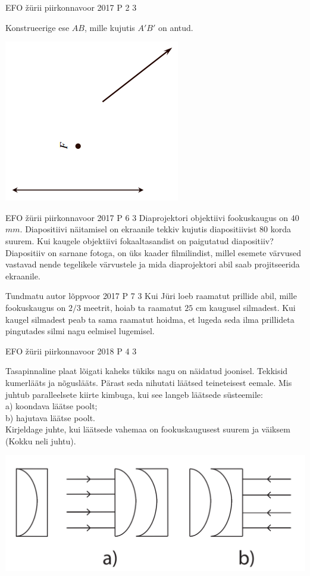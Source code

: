 \documentclass[11pt]{article}
\begin{document}
{%
{EFO žürii} %
{piirkonnavoor} %
{2017} %
{P 2} %
{3} %
{
\ifStatement
Konstrueerige ese $AB$, mille kujutis $A'B'$ on antud. 
\begin{center}
	\includegraphics[width=0.5\linewidth]{2017-v2p-02-yl.PNG}
\end{center}
\fi
}


{EFO žürii} %
{piirkonnavoor} %
{2017} %
{P 6} %
{3} %
{
\ifStatement
Diaprojektori objektiivi fookuskaugus on $40$ $mm$. Diapositiivi näitamisel on ekraanile tekkiv kujutis diapositiivist $80$ korda suurem. Kui kaugele objektiivi fokaaltasandist on paigutatud diapositiiv? Diapositiiv on sarnane fotoga, on üks kaader filmilindist, millel esemete värvused vastavad nende tegelikele värvustele ja mida diaprojektori abil saab projitseerida ekraanile.
\fi
}

{Tundmatu autor} %
{lõppvoor} %
{2017} %
{P 7} %
{3} %
{
\ifStatement
Kui Jüri loeb raamatut prillide abil, mille fookuskaugus on $2/3$ meetrit, hoiab ta raamatut $25$ cm kaugusel silmadest. Kui kaugel silmadest peab ta sama raamatut hoidma, et lugeda seda ilma prillideta pingutades silmi nagu eelmisel lugemisel.
\fi
}


{EFO žürii} %
{piirkonnavoor} %
{2018} %
{P 4} %
{3} %
{
\ifStatement
Tasapinnaline plaat lõigati kaheks tükiks nagu on näidatud joonisel. Tekkisid kumerlääts ja nõguslääts. Pärast seda nihutati läätsed teineteisest eemale. Mis juhtub paralleelsete kiirte kimbuga, kui see langeb läätsede süsteemile: \\
a) koondava läätse poolt; \\
b) hajutava läätse poolt. \\
Kirjeldage juhte, kui läätsede vahemaa on fookuskaugusest suurem ja väiksem (Kokku neli juhtu).
\ifSolution
\begin{center}
	\includegraphics[width=0.5\linewidth]{2018-v2p-04-yl.PNG}
\end{center}
\fi
}


}
\end{document}
